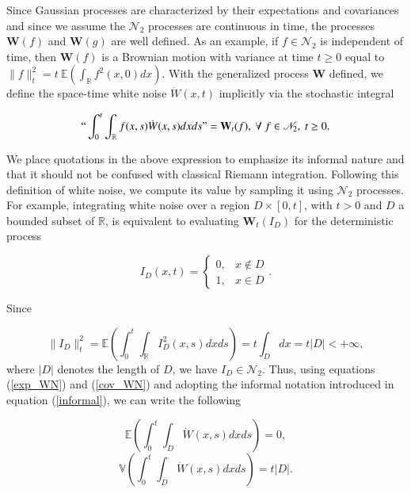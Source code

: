 \documentclass[]{elsarticle} %
\begin{document}
Since Gaussian processes are characterized by their expectations and
covariances and since we assume the \(\mathscr{N}_2\) processes are
continuous in time, the processes \(\mathbf W(f)\) and \(\mathbf W(g)\)
are well defined. As an example, if \(f\in\mathscr{N}_2\) is independent
of time, then \(\mathbf W(f)\) is a Brownian motion with variance at
time \(t\geq0\) equal to
\(\|f\|_t^2=t \ \mathbb{E}(\int_\mathbb{R}f^2(x,0)dx)\). With the
generalized process \(\mathbf W\) defined, we define the space-time
white noise \(\dot W(x,t)\) implicitly via the stochastic integral

\begin{equation}\label{informal}
``\int_0^t\int_\mathbb{R}f(x,s)\dot W(x,s)dxds"=\mathbf W_t(f), \ \forall \ f\in\mathscr{N}_2, \ t\geq0.
\end{equation}

We place quotations in the above expression to emphasize its informal
nature and that it should not be confused with classical Riemann
integration. Following this definition of white noise, we compute its
value by sampling it using \(\mathscr{N}_2\) processes. For example,
integrating white noise over a region \(D\times[0,t]\), with \(t>0\) and
\(D\) a bounded subset of \(\mathbb{R}\), is equivalent to evaluating
\(\mathbf W_t(I_D)\) for the deterministic process

\begin{equation}
I_D(x,t)=\left\{\begin{matrix}
0, & x\notin D \\
1, & x\in D
\end{matrix}\right..
\end{equation}

Since

\begin{equation}
\|I_D\|_t^2=\mathbb{E}\left(\int_0^t\int_\mathbb{R}I_D^2(x,s)dxds\right)=t\int_Ddx=t|D|<+\infty, 
\end{equation} where \(|D|\) denotes the length of \(D\), we have
\(I_D\in\mathscr{N}_2\). Thus, using equations (\ref{exp_WN}) and
(\ref{cov_WN}) and adopting the informal notation introduced in equation
(\ref{informal}), we can write the following

\begin{equation}
\mathbb{E}\left(\int_0^t\int_D\dot W(x,s)dxds\right)=0,
\end{equation} \begin{equation}
\mathbb{V}\left(\int_0^t\int_D\dot W(x,s)dxds\right)=t|D|.
\end{equation}
\end{document}
